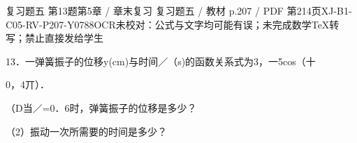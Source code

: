 \begin{bankitem}{复习题五 第13题}{第5章 / 章末复习 复习题五 / 教材 p.207 / PDF 第214页}{XJ-B1-C05-RV-P207-Y0788}{OCR未校对：公式与文字均可能有误；未完成数学TeX转写；禁止直接发给学生}
\begin{ocrdraft}
\par
13．一弹簧振子的位移y(cm)与时间／（s)的函数关系式为3，一5cos（十
\par
0，4丌）．
\par
（D当／=0．6时，弹簧振子的位移是多少？
\par
（2）振动一次所需要的时间是多少？
\end{ocrdraft}
\end{bankitem}
